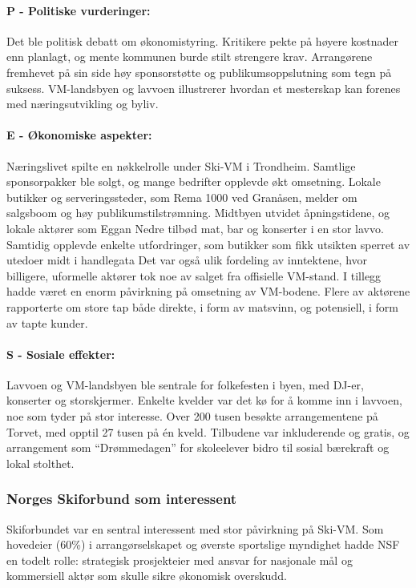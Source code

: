 \paragraph{P - Politiske vurderinger:}
Det ble politisk debatt om økonomistyring. Kritikere pekte på høyere kostnader enn planlagt, og mente kommunen burde stilt strengere krav\parencite{nettavisenKritikk}. Arrangørene fremhevet på sin side høy sponsorstøtte og publikumsoppslutning som tegn på suksess\parencite{kom24Sponsorsalg}. VM-landsbyen og lavvoen illustrerer hvordan et mesterskap kan forenes med næringsutvikling og byliv.

\paragraph{E - Økonomiske aspekter:}
Næringslivet spilte en nøkkelrolle under Ski-VM i Trondheim. Samtlige sponsorpakker ble solgt, og mange bedrifter opplevde økt omsetning\parencite{kom24Sponsorsalg}. Lokale butikker og serveringssteder, som Rema 1000 ved Granåsen, melder om salgsboom og høy publikumstilstrømning\parencite{nettavisenRema}. Midtbyen utvidet åpningstidene, og lokale aktører som Eggan Nedre tilbød mat, bar og konserter i en stor lavvo\parencite{midtbyenProgram}. Samtidig opplevde enkelte utfordringer, som butikker som fikk utsikten sperret av utedoer midt i handlegata\parencite{nettavisenToalett} Det var også ulik fordeling av inntektene, hvor billigere, uformelle aktører tok noe av salget fra offisielle VM-stand\parencite{nettavisenRema}. I tillegg hadde været en enorm påvirkning på omsetning av VM-bodene. Flere av aktørene rapporterte om store tap både direkte, i form av matsvinn, og potensiell, i form av tapte kunder\parencite{innherredTragedie}.

\paragraph{S - Sosiale effekter:}
Lavvoen og VM-landsbyen ble sentrale for folkefesten i byen, med DJ-er, konserter og 
storskjermer. Enkelte kvelder var det kø for å komme inn i lavvoen, noe som tyder på stor 
interesse. Over 200 tusen besøkte arrangementene på Torvet, med opptil 27 tusen på én kveld\parencite{wikipediaSkiVM}. 
Tilbudene var inkluderende og gratis, og arrangement som “Drømmedagen” for skoleelever bidro til 
sosial bærekraft og lokal stolthet\parencite{wikipediaSkiVM}.

\subsubsection{Norges Skiforbund som interessent}
Skiforbundet var en sentral interessent med stor påvirkning på Ski-VM. Som hovedeier (60\%) i arrangørselskapet og øverste sportslige myndighet hadde NSF en todelt rolle: strategisk prosjekteier med ansvar for nasjonale mål og kommersiell aktør som skulle sikre økonomisk overskudd\cite{ProffSkiVM2025}.

